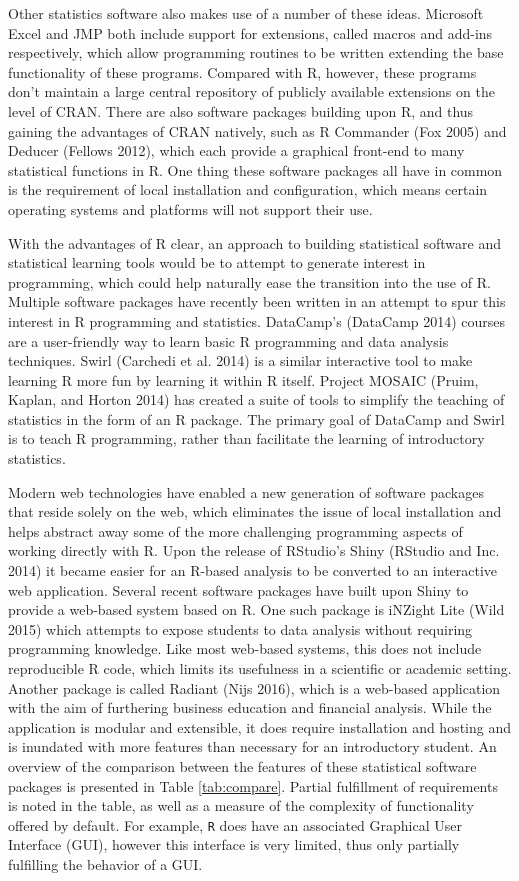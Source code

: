 \documentclass[12pt,]{article}
\begin{document}
Other statistics software also makes use of a number of these ideas.
Microsoft Excel and JMP both include support for extensions, called
macros and add-ins respectively, which allow programming routines to be
written extending the base functionality of these programs. Compared
with R, however, these programs don't maintain a large central
repository of publicly available extensions on the level of CRAN. There
are also software packages building upon R, and thus gaining the
advantages of CRAN natively, such as R Commander (Fox 2005) and Deducer
(Fellows 2012), which each provide a graphical front-end to many
statistical functions in R. One thing these software packages all have
in common is the requirement of local installation and configuration,
which means certain operating systems and platforms will not support
their use.

With the advantages of R clear, an approach to building statistical
software and statistical learning tools would be to attempt to generate
interest in programming, which could help naturally ease the transition
into the use of R. Multiple software packages have recently been written
in an attempt to spur this interest in R programming and statistics.
DataCamp's (DataCamp 2014) courses are a user-friendly way to learn
basic R programming and data analysis techniques. Swirl (Carchedi et al.
2014) is a similar interactive tool to make learning R more fun by
learning it within R itself. Project MOSAIC (Pruim, Kaplan, and Horton
2014) has created a suite of tools to simplify the teaching of
statistics in the form of an R package. The primary goal of DataCamp and
Swirl is to teach R programming, rather than facilitate the learning of
introductory statistics.

Modern web technologies have enabled a new generation of software
packages that reside solely on the web, which eliminates the issue of
local installation and helps abstract away some of the more challenging
programming aspects of working directly with R. Upon the release of
RStudio's Shiny (RStudio and Inc. 2014) it became easier for an R-based
analysis to be converted to an interactive web application. Several
recent software packages have built upon Shiny to provide a web-based
system based on R. One such package is iNZight Lite (Wild 2015) which
attempts to expose students to data analysis without requiring
programming knowledge. Like most web-based systems, this does not
include reproducible R code, which limits its usefulness in a scientific
or academic setting. Another package is called Radiant (Nijs 2016),
which is a web-based application with the aim of furthering business
education and financial analysis. While the application is modular and
extensible, it does require installation and hosting and is inundated
with more features than necessary for an introductory student. An
overview of the comparison between the features of these statistical
software packages is presented in Table \ref{tab:compare}. Partial
fulfillment of requirements is noted in the table, as well as a measure
of the complexity of functionality offered by default. For example,
\texttt{R} does have an associated Graphical User Interface (GUI),
however this interface is very limited, thus only partially fulfilling
the behavior of a GUI.
\end{document}
